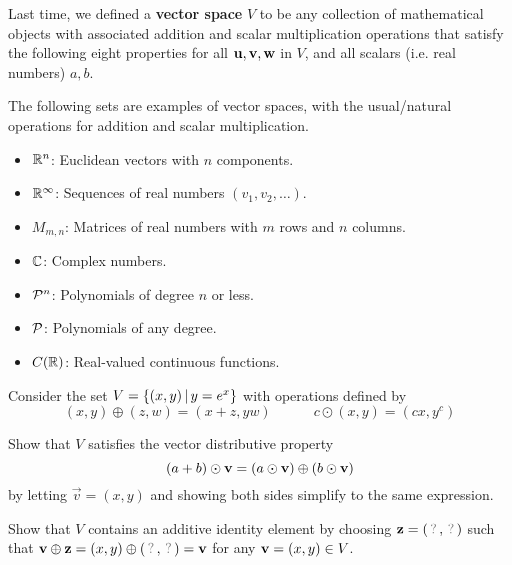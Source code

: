 \begin{applicationActivities}
\begin{remark}
  Last time, we defined a \textbf{vector space} \(V\) to be any collection of
  mathematical objects with
  associated addition and scalar multiplication operations that satisfy
  the following eight properties for all \(\vect u,\vect v,\vect w\) in \(V\),
  and all scalars (i.e. real numbers) \(a,b\).

  \vectorSpaceProperties
\end{remark}

\begin{remark}
  The following sets are examples of vector spaces, with the usual/natural
  operations for addition and scalar multiplication.
  \begin{itemize}
    \item \(\IR^n\): Euclidean vectors with \(n\) components.
    \item \(\IR^\infty\): Sequences of real numbers \((v_1,v_2,\dots)\).
    \item \(M_{m,n}\): Matrices of real numbers with \(m\) rows and
          \(n\) columns.
    \item \(\IC\): Complex numbers.
    \item \(\P^n\): Polynomials of degree \(n\) or less.
    \item \(\P\): Polynomials of any degree.
    \item \(C(\IR)\): Real-valued continuous functions.
  \end{itemize}
\end{remark}

\begin{activity}{20}
  Consider the set \(V=\setBuilder{(x,y)}{y=e^x}\) with operations defined by
  \[
    (x,y)\oplus (z,w)=(x+z,yw)
      \hspace{3em}
    c\odot (x,y)=(cx,y^c)
  \]
  \begin{subactivity}
  Show that $V$ satisfies the vector distributive property
  \[(a+b)\odot\vect v=(a\odot\vect v)\oplus (b\odot\vect v)\]
  by letting \(\vec v=(x,y)\) and showing both sides simplify to the same
  expression.
  \end{subactivity}
  \begin{subactivity}%
  Show that $V$ contains an additive identity element by choosing
  \(\vect{z}=(\unknown,\unknown)\) such that
  \(\vect{v}\oplus\vect{z}=(x,y)\oplus(\unknown,\unknown)=\vect{v}\)
  for any \(\vect{v}=(x,y)\in V\).
  \end{subactivity}
\end{activity}



\end{applicationActivities}
